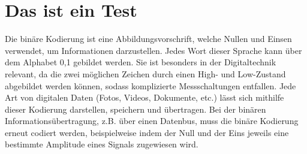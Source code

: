 \section{Das ist ein Test}
Die binäre Kodierung ist eine Abbildungsvorschrift, welche Nullen und Einsen verwendet,
um Informationen darzustellen. Jedes Wort dieser Sprache kann über dem Alphabet {0,1} gebildet werden.
Sie ist besonders in der Digitaltechnik relevant, da die zwei möglichen Zeichen durch
einen High- und Low-Zustand abgebildet werden können, sodass komplizierte Messschaltungen entfallen. \autocite{Fricke2003}
Jede Art von digitalen Daten (Fotos, Videos, Dokumente, etc.) lässt sich mithilfe dieser Kodierung
darstellen, speichern und übertragen.
Bei der binären Informationsübertragung, z.B. über einen Datenbus, muss die binäre Kodierung erneut
codiert werden, beispielweise indem der Null und der Eins jeweils eine bestimmte Amplitude eines 
Signals zugewiesen wird.
